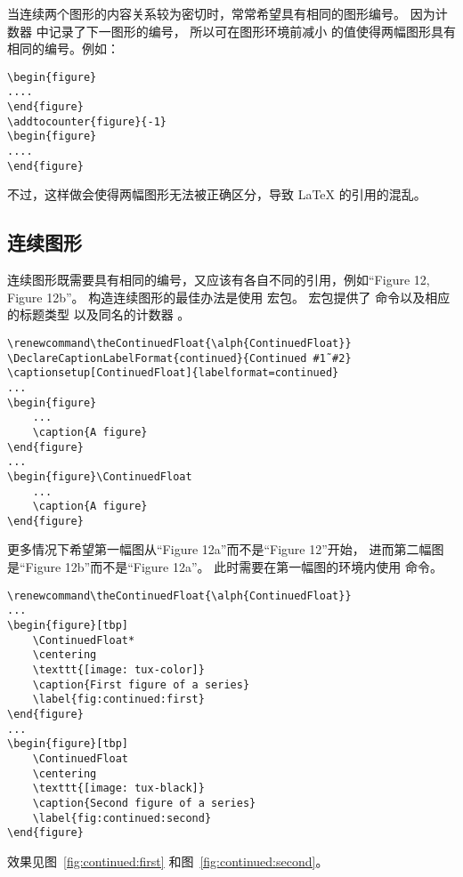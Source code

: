 当连续两个图形的内容关系较为密切时，常常希望具有相同的图形编号。
因为计数器  中记录了下一图形的编号，
所以可在图形环境前减小  的值使得两幅图形具有相同的编号。例如：
\begin{lstlisting}
\begin{figure}
....
\end{figure}
\addtocounter{figure}{-1}
\begin{figure}
....
\end{figure}
\end{lstlisting}
不过，这样做会使得两幅图形无法被正确区分，导致 \LaTeX{} 的引用的混乱。

\subsection{连续图形}

连续图形既需要具有相同的编号，又应该有各自不同的引用，例如“Figure 12, Figure 12b”。
构造连续图形的最佳办法是使用  宏包。
 宏包提供了  命令以及相应的标题类型  以及同名的计数器 。
\begin{lstlisting}
\renewcommand\theContinuedFloat{\alph{ContinuedFloat}}
\DeclareCaptionLabelFormat{continued}{Continued #1˜#2}
\captionsetup[ContinuedFloat]{labelformat=continued}
...
\begin{figure}
	...
	\caption{A figure}
\end{figure}
...
\begin{figure}\ContinuedFloat
	...
	\caption{A figure}
\end{figure}
\end{lstlisting}

更多情况下希望第一幅图从“Figure 12a”而不是“Figure 12”开始，
进而第二幅图是“Figure 12b”而不是“Figure 12a”。
此时需要在第一幅图的环境内使用  命令。
\begin{lstlisting}
\renewcommand\theContinuedFloat{\alph{ContinuedFloat}}
...
\begin{figure}[tbp]
	\ContinuedFloat*
	\centering
	\texttt{[image: tux-color]}
	\caption{First figure of a series}
	\label{fig:continued:first}
\end{figure}
...
\begin{figure}[tbp]
	\ContinuedFloat
	\centering
	\texttt{[image: tux-black]}
	\caption{Second figure of a series}
	\label{fig:continued:second}
\end{figure}
\end{lstlisting}
效果见图~\ref{fig:continued:first} 和图~\ref{fig:continued:second}。

